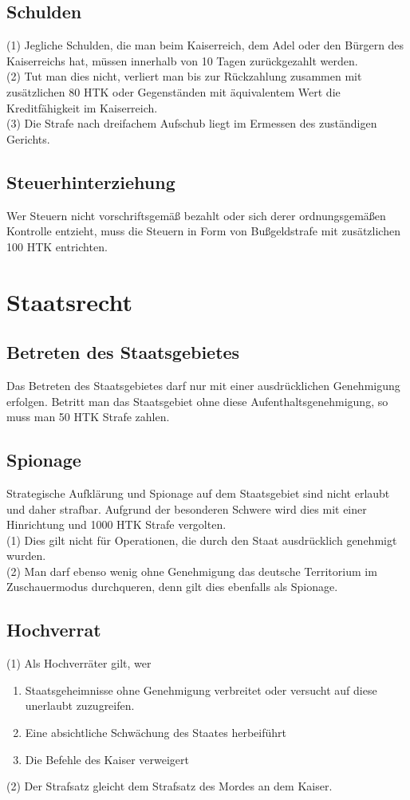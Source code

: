 \documentclass{article}
\begin{document}
\subsection{Schulden}\label{schulden}
(1) Jegliche Schulden, die man beim Kaiserreich, dem Adel oder den Bürgern des Kaiserreichs hat, müssen innerhalb von 10 Tagen zurückgezahlt werden.\\
(2) Tut man dies nicht, verliert man bis zur Rückzahlung zusammen mit zusätzlichen 80 HTK oder Gegenständen mit äquivalentem Wert die Kreditfähigkeit im Kaiserreich.\\
(3) Die Strafe nach dreifachem Aufschub liegt im Ermessen des zuständigen Gerichts.

\subsection{Steuerhinterziehung} \label{steuern}
Wer Steuern nicht vorschriftsgemäß bezahlt oder sich derer ordnungsgemäßen Kontrolle entzieht, muss die Steuern in Form von
Bußgeldstrafe mit zusätzlichen 100 HTK entrichten.

\section{Staatsrecht}

\subsection{Betreten des Staatsgebietes}
Das Betreten des Staatsgebietes darf nur mit einer ausdrücklichen Genehmigung erfolgen. Betritt man das Staatsgebiet ohne diese Aufenthaltsgenehmigung, so muss man 50 HTK Strafe zahlen.

\subsection{Spionage}
Strategische Aufklärung und Spionage auf dem Staatsgebiet sind nicht erlaubt und daher strafbar. Aufgrund der besonderen Schwere wird dies mit einer Hinrichtung und 1000 HTK Strafe vergolten.\\
(1) Dies gilt nicht für Operationen, die durch den Staat ausdrücklich genehmigt wurden. \\
(2) Man darf ebenso wenig ohne Genehmigung das deutsche Territorium im Zuschauermodus durchqueren, denn gilt dies ebenfalls als Spionage.

\subsection{Hochverrat}\label{verrat}
(1)	Als Hochverräter gilt, wer
\begin{enumerate}
	\item Staatsgeheimnisse ohne Genehmigung verbreitet oder versucht auf diese unerlaubt zuzugreifen.
	\item Eine absichtliche Schwächung des Staates herbeiführt
	\item Die Befehle des Kaiser verweigert
\end{enumerate}
(2)	Der Strafsatz gleicht dem Strafsatz des Mordes an dem Kaiser.
\end{document}
